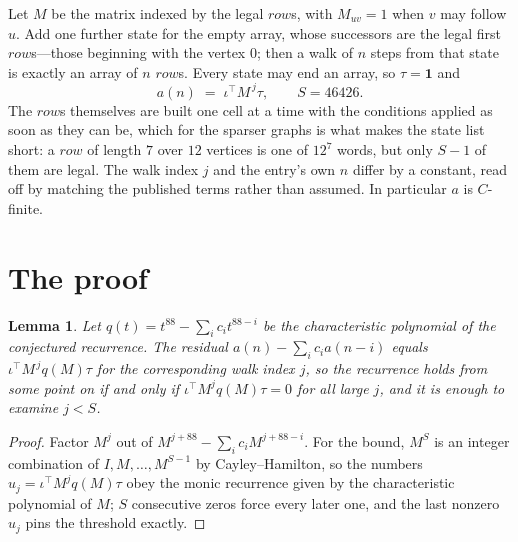 \documentclass[11pt,a4paper]{article}
\theoremstyle{plain}
\newtheorem{lemma}[theorem]{Lemma}
\theoremstyle{definition}
\begin{document}
Let $M$ be the matrix indexed by the legal $row$s, with $M_{uv}=1$ when $v$ may
follow $u$. Add one further state for the empty array, whose successors are the legal first
$row$s---those beginning with the vertex $0$; then a walk of
$n$ steps from that state is exactly an array of $n$ $row$s. Every state may end an
array, so $\tau=\mathbf{1}$ and
\[
a(n)\;=\;\iota^{\!\top}M^{\,j}\tau ,\qquad S=46426.
\]
The $row$s themselves are built one cell at a time with the conditions applied as soon
as they can be, which for the sparser graphs is what makes the state list short: a $row$
of length $7$ over $12$ vertices is one of $12^{7}$ words, but only $S-1$ of them are
legal. The walk index $j$ and the entry's own $n$ differ by a constant, read off by matching the
published terms rather than assumed. In particular $a$ is $C$-finite.

\section{The proof}

\begin{lemma}\label{lem:crit}
Let $q(t)=t^{88}-\sum_i c_it^{88-i}$ be the characteristic polynomial of the
conjectured recurrence. The residual $a(n)-\sum_ic_ia(n-i)$ equals
$\iota^{\!\top}M^{\,j}q(M)\tau$ for the corresponding walk index $j$, so the recurrence
holds from some point on if and only if $\iota^{\!\top}M^{j}q(M)\tau=0$ for all large $j$,
and it is enough to examine $j<S$.
\end{lemma}

\begin{proof}
Factor $M^{j}$ out of $M^{j+88}-\sum_ic_iM^{j+88-i}$. For the bound, $M^{S}$
is an integer combination of $I,M,\dots,M^{S-1}$ by Cayley--Hamilton, so the numbers
$u_j=\iota^{\!\top}M^{j}q(M)\tau$ obey the monic recurrence given by the characteristic
polynomial of $M$; $S$ consecutive zeros force every later one, and the last nonzero $u_j$
pins the threshold exactly.
\end{proof}
\end{document}
